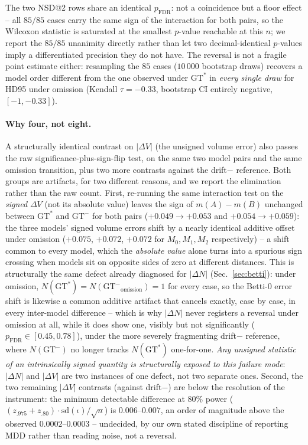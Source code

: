 \documentclass[
    bookmarks, bookmarksnumbered, bookmarksopen,
    colorlinks=true, citecolor=blue, linkcolor=blue, urlcolor=blue
]{techrep}
\newcommand{\gtstar}{\ensuremath{\mathrm{GT}^{\!*}}}
\newcommand{\gtminus}{\ensuremath{\mathrm{GT}^{\!-}}}
\begin{document}
The two NSD@2 rows share an identical $p_{\text{FDR}}$: not a coincidence but a floor effect --
all $85/85$ cases carry the same sign of the interaction for both pairs, so the Wilcoxon statistic
is saturated at the smallest $p$-value reachable at this $n$; we report the $85/85$ unanimity
directly rather than let two decimal-identical $p$-values imply a differentiated precision they do
not have. The reversal is not a fragile point estimate either: resampling the $85$ cases
($10\,000$ bootstrap draws) recovers a model order different from the one observed under $\gtstar$
in \emph{every single draw} for HD95 under omission (Kendall $\tau=-0.33$, bootstrap CI entirely
negative, $[-1,-0.33]$).

\paragraph{Why four, not eight.} A structurally identical contrast on $|\Delta V|$ (the unsigned
volume error) also passes the raw significance-plus-sign-flip test, on the same two model pairs
and the same omission transition, plus two more contrasts against the drift$-$ reference. Both
groups are artifacts, for two different reasons, and we report the elimination rather than the
raw count. First, re-running the same interaction test on the \emph{signed} $\Delta V$ (not its
absolute value) leaves the sign of $m(A)-m(B)$ unchanged between $\gtstar$ and $\gtminus$ for both
pairs ($+0.049\to+0.053$ and $+0.054\to+0.059$): the three models' signed volume errors shift by a
nearly identical additive offset under omission ($+0.075$, $+0.072$, $+0.072$ for $M_0,M_1,M_2$
respectively) -- a shift common to every model, which the \emph{absolute value} alone turns into a
spurious sign crossing when models sit on opposite sides of zero at different distances. This is
structurally the same defect already diagnosed for $|\Delta N|$ (Sec.~\ref{sec:betti}): under
omission, $N(\gtstar)=N(\gtminus_{\text{omission}})=1$ for every case, so the Betti-$0$ error shift
is likewise a common additive artifact that cancels exactly, case by case, in every inter-model
difference -- which is why $|\Delta N|$ never registers a reversal under omission at all, while it
does show one, visibly but not significantly ($p_{\text{FDR}}\in[0.45,0.78]$), under the more
severely fragmenting drift$-$ reference, where $N(\gtminus)$ no longer tracks $N(\gtstar)$
one-for-one. \emph{Any unsigned statistic of an intrinsically signed quantity is structurally
exposed to this failure mode}: $|\Delta N|$ and $|\Delta V|$ are two instances of one defect, not
two separate ones. Second, the two remaining $|\Delta V|$ contrasts (against drift$-$) are below
the resolution of the instrument: the minimum detectable difference at $80\%$ power
($(z_{.975}{+}z_{.80})\cdot\mathrm{sd}(\iota)/\sqrt{n}$) is $0.006$--$0.007$, an order of magnitude
above the observed $0.0002$--$0.0003$ -- undecided, by our own stated discipline of reporting MDD
rather than reading noise, not a reversal.
\end{document}
